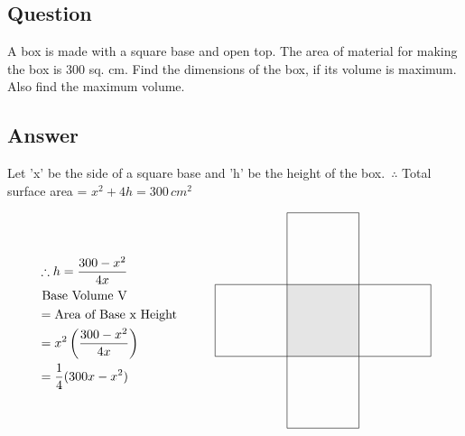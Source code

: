 \documentclass[17pt]{extarticle}
\begin{document}
\noindent
\begin{fleqn} 


\section{Question}
A box is made with a square base and open top. The area of material for making the box is 300 sq. cm. Find the dimensions of the box, if its volume is maximum. Also find the maximum volume.


\subsection*{Answer}
Let  'x'  be the side of a square base and 'h' be the height of the box.\
$\therefore$ Total surface area = $x^2+4h = 300\,cm^2$

\begin{equation} \nonumber
\begin{alignedat}{4}
& \therefore h = \frac{300 - x^2}{4x}\\
& \text{ Base Volume V} \\
&= \text{Area of Base x Height}\\
&= x^2\left(\frac{300-x^2}{4x}\right)\\
&= \frac{1}{4}(300x - x^2)\\
\end{alignedat}
\quad\quad\quad
\begin{alignedat}{4}
\begin{tikzpicture}
\draw (0,0) -- (0,2) -- (2,2) -- (2,4) -- (4,4) -- (4,2) -- (6,2) -- (6,0) -- (4,0) -- (4,-2) -- (2,-2) -- (2,0) -- (0,0) ; 
\filldraw[fill=gray!20] (2,0) rectangle (4,2);
\end{tikzpicture}
\end{alignedat}
\end{equation}
\quad
\vspace*{-5mm}


\end{fleqn}
\end{document}
